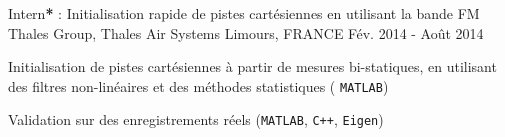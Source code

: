 \begin{cventries}

\cventry
{Intern\textbf{*} : Initialisation rapide de pistes cartésiennes en utilisant la bande FM} %
{Thales Group, Thales Air Systems} %
{Limours, FRANCE} %
{Fév. 2014 - Août 2014} %
{ %
\begin{cvitems}
\item {Initialisation de pistes cartésiennes à partir de mesures bi-statiques, en utilisant des filtres non-linéaires et des méthodes statistiques ( \texttt{MATLAB})}
\item {Validation sur des enregistrements réels (\texttt{MATLAB}, \texttt{C++}, \texttt{Eigen})}
\end{cvitems}
}
\end{cventries}
